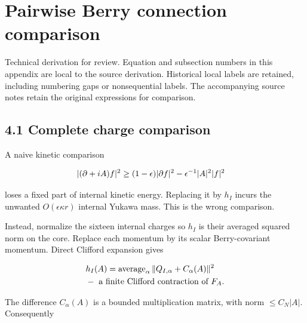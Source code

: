 \clearpage
\section{Pairwise Berry connection
comparison}\label{f-pairwise-berry-connection-comparison}

Technical derivation for review. Equation and subsection numbers in this
appendix are local to the source derivation. Historical local labels are
retained, including numbering gaps or nonsequential labels. The
accompanying source notes retain the original expressions for
comparison.

\subsection{4.1 Complete charge
comparison}\label{f-complete-charge-comparison}

A naive kinetic comparison

\begin{gather*}
\begin{aligned}
& \vert (\partial +iA)f\vert ^{2} \ge  (1-\epsilon )\vert \partial  f\vert ^{2}-\epsilon ^{-1}\vert A\vert ^{2}\vert f\vert ^{2}
\end{aligned}\notag
\end{gather*}

loses a fixed part of internal kinetic energy. Replacing it by \(h_{I}\)
incurs the unwanted \(O(\epsilon  \kappa  r)\) internal Yukawa mass.
This is the wrong comparison.

Instead, normalize the sixteen internal charges so \(h_{I}\) is their
averaged squared norm on the core. Replace each momentum by its scalar
Berry-covariant momentum. Direct Clifford expansion gives

\begin{gather*}
\begin{aligned}
& h_{I}(A)= \operatorname{average} _{\alpha} \Vert Q_{I,\alpha}+C_{\alpha}(A)\Vert ^{2} \\
& - \text{ a finite Clifford contraction of } F_{A}.
\end{aligned}\notag
\end{gather*}

The difference \(C_{\alpha}(A)\) is a bounded multiplication matrix,
with norm \(\le C_{N}\vert A\vert\). Consequently

